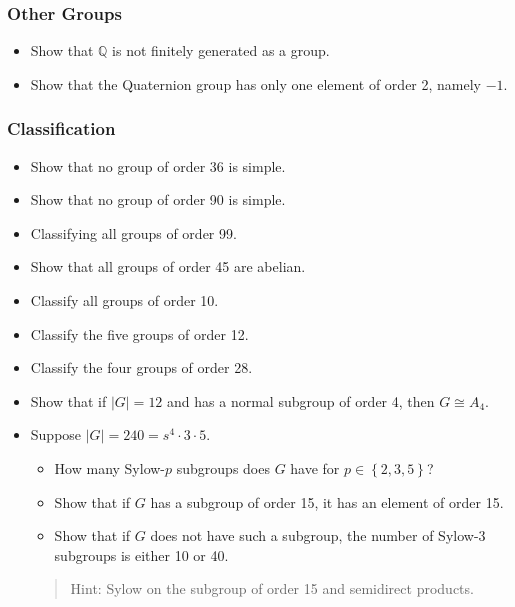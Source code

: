 \hypertarget{other-groups}{%
\subsubsection{Other Groups}\label{other-groups}}

\begin{itemize}
\tightlist
\item
  Show that \({\mathbb{Q}}\) is not finitely generated as a group.
\item
  Show that the Quaternion group has only one element of order 2, namely
  \(-1\).
\end{itemize}

\hypertarget{classification}{%
\subsubsection{Classification}\label{classification}}

\begin{itemize}
\tightlist
\item
  Show that no group of order 36 is simple.
\item
  Show that no group of order 90 is simple.
\item
  Classifying all groups of order 99.
\item
  Show that all groups of order 45 are abelian.
\item
  Classify all groups of order 10.
\item
  Classify the five groups of order 12.
\item
  Classify the four groups of order 28.
\item
  Show that if \({\left\lvert {G} \right\rvert} = 12\) and has a normal
  subgroup of order 4, then \(G \cong A_4\).
\item
  Suppose
  \({\left\lvert {G} \right\rvert} = 240 = s^4 \cdot 3 \cdot 5\).

  \begin{itemize}
  \tightlist
  \item
    How many Sylow-\(p\) subgroups does \(G\) have for
    \(p\in \left\{{2, 3, 5}\right\}\)?
  \item
    Show that if \(G\) has a subgroup of order 15, it has an element of
    order 15.
  \item
    Show that if \(G\) does not have such a subgroup, the number of
    Sylow-\(3\) subgroups is either 10 or 40.
  \end{itemize}

  \begin{quote}
  Hint: Sylow on the subgroup of order 15 and semidirect products.
  \end{quote}
\end{itemize}

